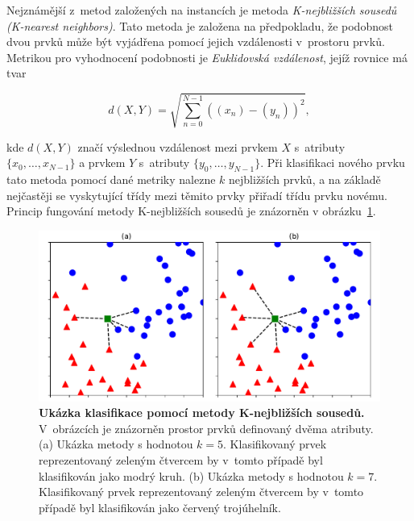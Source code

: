 Nejznámější z~metod založených na instancích je metoda \textit{K-nejbližších sousedů (K-nearest neighbors)}. Tato metoda je založena na předpokladu, že podobnost dvou prvků může být vyjádřena pomocí jejich vzdálenosti v~prostoru prvků. Metrikou pro vyhodnocení podobnosti je \textit{Euklidovská vzdálenost}, jejíž rovnice má tvar

\begin{equation}
    d(X, Y) = \sqrt{\sum\limits_{n=0}^{N-1} ((x_n)-(y_n))^2},
\end{equation}

\medskip

\noindent kde $d(X, Y)$ značí výslednou vzdálenost mezi prvkem $X$ s~atributy $\{x_0, \dots, x_{N-1}\}$ a prvkem $Y$ s~atributy $\{y_0, \dots, y_{N-1}\}$. Při klasifikaci nového prvku tato metoda pomocí dané metriky nalezne $k$ nejbližších prvků, a na základě nejčastěji se vyskytující třídy mezi těmito prvky přiřadí třídu prvku novému. Princip fungování metody K-nejbližších sousedů je znázorněn v obrázku~\ref{obr_knn}.\cite{strojove_uceni}\cite{machine_learning}

\begin{figure}[h]
    \centering
    \includegraphics[width=\textwidth]{obrazky/knn.pdf}
    \caption{\textbf{Ukázka klasifikace pomocí metody K-nejbližších sousedů.} V~obrázcích je znázorněn prostor prvků definovaný dvěma atributy. (a) Ukázka metody s hodnotou $k = 5$. Klasifikovaný prvek reprezentovaný zeleným čtvercem by v~tomto případě byl klasifikován jako modrý kruh. (b) Ukázka metody s hodnotou $k = 7$. Klasifikovaný prvek reprezentovaný zeleným čtvercem by v~tomto případě byl klasifikován jako červený trojúhelník.}
    \label{obr_knn}
\end{figure}

